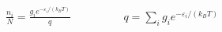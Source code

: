 \documentclass{standalone}
\begin{document}
$\displaystyle
\frac{n_i}{N}=\frac{g_ie^{-\varepsilon_i/(k_BT)}}{q}
\hspace{2cm}
q=\sum\limits_{i} g_ie^{-\varepsilon_i/(k_BT)}
$
\end{document}
